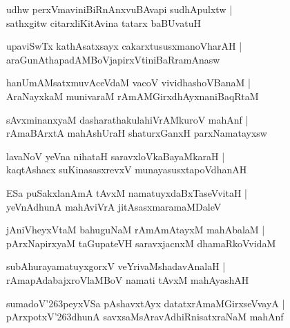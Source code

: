 \documentclass[twoside,12pt,openright]{book}
\def\S{\char'263}
\newcounter{shloka}[chapter]
\begin{document}
\begin{shloka}%
udhw perxVmaviniBiRnAnxvuBAvapi sudhApulxtw |\\
sathxgitw citarxliKitAvina tatarx baBUvatuH
\end{shloka}

\begin{shloka}%
upaviSwTx kathAsatxsayx cakarxtususxmanoVharAH |\\
araGunAthapadAMBoVjapirxVtiniBaRramAnasw
\end{shloka}

\begin{shloka}%
hanUmAMsatxmuvAceVdaM vacoV vividhashoVBanaM |\\
AraNayxkaM munivaraM rAmAMGirxdhAyxnaniBaqRtaM 
\end{shloka}

\begin{shloka}%
sAvxminanxyaM dasharathakulahiVrAMkuroV mahAnf |\\
rAmaBArxtA mahAshUraH shaturxGanxH parxNamatayxsw 
\end{shloka}

\begin{shloka}%
lavaNoV yeVna nihataH saravxloVkaBayaMkaraH |\\
kaqtAshacx suKinasasxrevxV munayasusxtapoVdhanAH 
\end{shloka}

\begin{shloka}%
ESa puSakxlanAmA tAvxM namatuyxdaBxTaseVvitaH |\\
yeVnAdhunA mahAviVrA jitAsasxmaramaMDaleV 
\end{shloka}

\begin{shloka}%
jAniVheyxVtaM bahuguNaM rAmAmAtayxM mahAbalaM |\\
pArxNapirxyaM taGupateVH saravxjacnxM dhamaRkoVvidaM 
\end{shloka}

\begin{shloka}%
subAhurayamatuyxgorxV veYrivaMshadavAnalaH |\\
rAmapAdabajxroVlaMBoV namati tAvxM mahAyashAH 
\end{shloka}

\begin{shloka}%
sumadoV\S peyxVSa pAshavxtAyx datatxrAmaMGirxseVvayA |\\
pArxpotxV\S dhunA savxsaMsAravAdhiRnisatxraNaM mahAnf 
\end{shloka}
\end{document}
